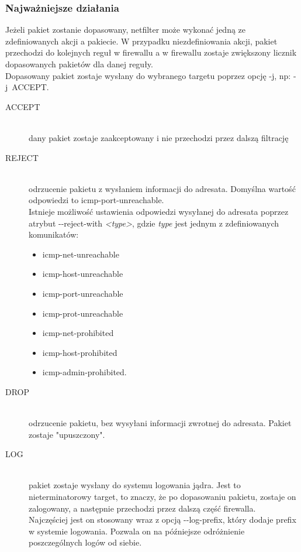 \documentclass[a4paper,12pt]{book}
\newcommand{\param}[1]{\textit{\textless #1\textgreater}}
\begin{document}
			\subsubsection{Najważniejsze działania}
				Jeżeli pakiet zostanie dopasowany, netfilter może wykonać jedną ze zdefiniowanych akcji a pakiecie. W przypadku niezdefiniowania akcji, pakiet przechodzi do kolejnych reguł w firewallu a w firewallu zostaje zwiększony licznik dopasowanych pakietów dla danej reguły.\\
				Dopasowany pakiet zostaje wysłany do wybranego targetu poprzez opcję -j, np: -j~ACCEPT.
				\begin{description}
					\item[ACCEPT] \hfill \\
						dany pakiet zostaje zaakceptowany i nie przechodzi przez dalszą filtrację
					\item[REJECT] \hfill \\
						odrzucenie pakietu z wysłaniem informacji do adresata. Domyślna wartość odpowiedzi to icmp-port-unreachable.\\
						Istnieje możliwość ustawienia odpowiedzi wysyłanej do adresata poprzez atrybut -{}-reject-with \param{type},
						gdzie \textit{type} jest jednym z zdefiniowanych komunikatów:
						\begin{itemize}
							\item icmp-net-unreachable
							\item icmp-host-unreachable
							\item icmp-port-unreachable
							\item icmp-prot-unreachable
							\item icmp-net-prohibited
							\item icmp-host-prohibited
							\item icmp-admin-prohibited.
						\end{itemize}
					\item[DROP] \hfill \\
						odrzucenie pakietu, bez wysyłani informacji zwrotnej do adresata. Pakiet zostaje "upuszczony".
					\item[LOG] \hfill \\
						pakiet zostaje wysłany do systemu logowania jądra. Jest to nieterminatorowy target, to znaczy, że po dopasowaniu pakietu, zostaje on zalogowany, a następnie przechodzi przez dalszą część firewalla.\\
						Najczęściej jest on stosowany wraz z opcją -{}-log-prefix, który dodaje prefix w systemie logowania. Pozwala on na późniejsze odróżnienie poszczególnych logów od siebie.

\end{description}
\end{document}
